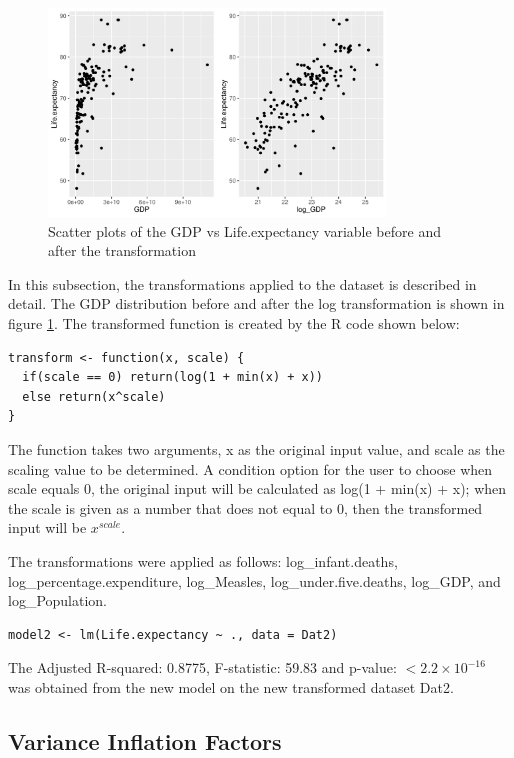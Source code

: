 \begin{figure}
  \centering
  \includegraphics[width = 0.8\textwidth]{figures/transforms}
  \caption{Scatter plots of the GDP vs Life.expectancy variable before and after the transformation}
  \label{fig:transforms}
\end{figure}

In this subsection, the transformations applied to the dataset is described in detail. The GDP distribution before and after the log transformation is shown in figure \ref{fig:transforms}. The transformed function is created by the R code shown below:
\begin{verbatim}
transform <- function(x, scale) {
  if(scale == 0) return(log(1 + min(x) + x))
  else return(x^scale)
}
\end{verbatim}
The function takes two arguments, x as the original input value, and scale as the scaling value to be determined. A condition option for the user to choose when scale equals 0, the original input will be calculated as log(1 + min(x) + x); when the scale is given as a number that does not equal to 0, then the transformed input will be $x^{scale}$.



The transformations were applied as follows: log\_infant.deaths, log\_percentage.expenditure, log\_Measles, log\_under.five.deaths, log\_GDP, and log\_Population.

\begin{verbatim}
model2 <- lm(Life.expectancy ~ ., data = Dat2)
\end{verbatim}

The Adjusted R-squared: 0.8775, F-statistic: 59.83 and p-value: $< 2.2\times 10^{-16}$ was obtained from the new model on the new transformed dataset Dat2.

\subsection{Variance Inflation Factors}

